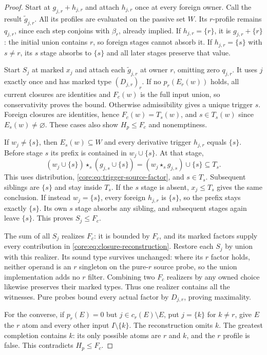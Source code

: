 \begin{proof}
Start at $g_{j,r}+h_{j,r}$ and attach $h_{j,r}$ once at every foreign
owner. Call the result $\widetilde g_{j,r}$. All its profiles are
evaluated on the passive set $W$. Its $r$-profile remains $q_{j,r}$,
since each step conjoins with $\beta_r$, already implied.
If $h_{j,r}=\{r\}$, it is $g_{j,r}+\{r\}$:
the initial union contains $r$, so foreign stages cannot absorb it.
If $h_{j,r}=\{s\}$ with $s\ne r$, its $s$ stage absorbs to $\{s\}$ and
all later stages preserve that value.

Start $S_j$ at marked $x_j$ and attach each $\widetilde g_{j,r}$
at owner $r$, omitting zero $q_{j,r}$. It uses $j$ exactly once and
has marked type $(D_{j,r})_r$. If no $p_r(E_r(w))$ holds, all current
closures are identities and $F_c(w)$ is the full input union, so
conservativity proves the bound. Otherwise admissibility gives a
unique trigger $s$. Foreign closures are identities, hence
$F_c(w)=T_s(w)$, and $s\in T_s(w)$ since $E_s(w)\ne\varnothing$.
These cases also show $H_p\leq F_c$ and nonemptiness.

If $w_j\ne\{s\}$, then $E_s(w)\subseteq W$ and every derivative
trigger $h_{j,r}$ equals $\{s\}$. Before stage $s$ its prefix is
contained in $w_j\cup\{s\}$. At that stage,
\[
 (w_j\cup\{s\})\star_s(g_{j,s}\cup\{s\})
   =(w_j\star_s g_{j,s})\cup\{s\}\subseteq T_s.
\]
This uses distribution, \eqref{core:eq:trigger-source-factor}, and
$s\in T_s$. Subsequent siblings are $\{s\}$ and stay inside $T_s$.
If the $s$ stage is absent, $x_j\leq T_s$ gives the same conclusion.
If instead $w_j=\{s\}$, every foreign $h_{j,r}$ is $\{s\}$, so the
prefix stays exactly $\{s\}$. Its own $s$ stage absorbs any sibling,
and subsequent stages again leave $\{s\}$. This proves $S_j\leq F_c$.

The sum of all $S_j$ realizes $F_c$: it is bounded by $F_c$, and its
marked factors supply every contribution in
\eqref{core:eq:closure-reconstruction}. Restore each $S_j$ by union
with this realizer. Its sound type survives unchanged: where its
$r$ factor holds, neither operand is an $r$ singleton on the pure-$r$
source probe, so the union implementation adds no $r$ filter.
Combining two $F_c$ realizers by any owned choice likewise preserves
their marked types. Thus one realizer contains all the witnesses.
Pure probes bound every actual factor by $D_{j,r}$, proving maximality.

For the converse, if $p_r(E)=0$ but $j\in c_r(E)\setminus E$, put
$j=\{k\}$ for $k\ne r$, give $E$ the $r$ atom and every other input
$I\setminus\{k\}$. The reconstruction omits $k$. The greatest
completion contains $k$: its only possible atoms are $r$ and $k$,
and the $r$ profile is false. This contradicts $H_p\leq F_c$.
\end{proof}

